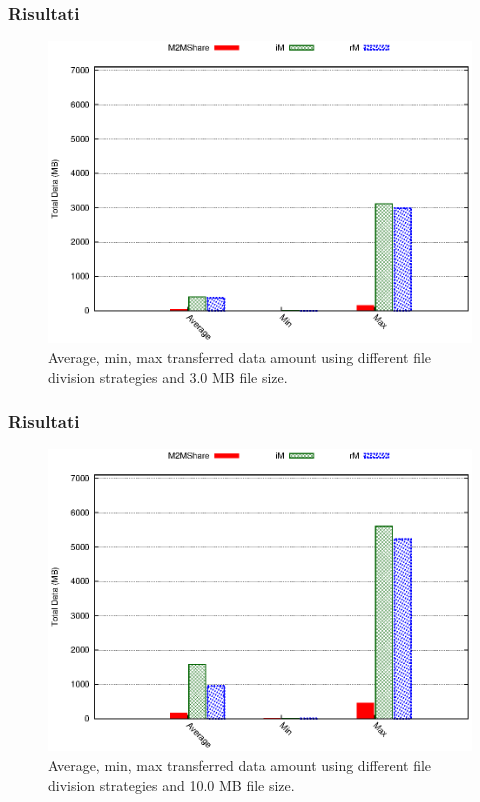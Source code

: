 \documentclass{beamer}
\begin{document}
\begin{frame}
\frametitle{Risultati}
\begin{center}
\begin{figure}[ht]
\includegraphics[scale=0.7]{../grafici/dataDFS_3MB.eps}
\caption{Average, min, max transferred data amount using different file division strategies and 3.0 MB file size.}
\end{figure}
\end{center}
\end{frame}

\begin{frame}
\frametitle{Risultati}
\begin{center}
\begin{figure}[ht]
\includegraphics[scale=0.7]{../grafici/dataDFS_10MB.eps}
\caption{Average, min, max transferred data amount using different file division strategies and 10.0 MB file size.}
\end{figure}
\end{center}
\end{frame}
\end{document}
